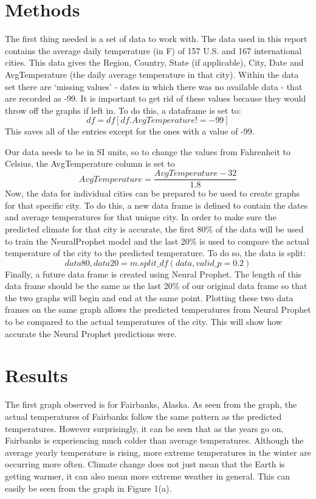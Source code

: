 \documentclass[11pt,a4paper,fleqn]{article}
\begin{document}
\section{Methods}\label{sec:Methods}
The first thing needed is a set of data to work with. The data used in this report contains the average daily temperature (in \textdegree F) of 157 U.S. and 167 international cities.\cite{daytonwebsite} This data gives the Region, Country, State (if applicable), City, Date and AvgTemperature (the daily average temperature in that city). Within the data set there are `missing values' - dates in which there was no available data - that are recorded as -99. It is important to get rid of these values because they would throw off the graphs if left in. To do this, a dataframe is set to: 
$$df = df[df.AvgTemperature != -99]$$
This saves all of the entries except for the ones with a value of -99. \par
Our data needs to be in SI units, so to change the values from Fahrenheit to Celsius, the AvgTemperature column is set to 
$$AvgTemperature = \frac{AvgTemperature - 32}{1.8}$$
Now, the data for individual cities can be prepared to be used to create graphs for that specific city. To do this, a new data frame is defined to contain the dates and average temperatures for that unique city. In order to make sure the predicted climate for that city is accurate, the first 80\% of the data will be used to train the NeuralProphet model and the last 20\% is used to compare the actual temperature of the city to the predicted temperature. To do so, the data is split:
$$data80, data20 = m.split\_df(data, valid\_p=0.2)$$
Finally, a future data frame is created using Neural Prophet. The length of this data frame should be the same as the last 20\% of our original data frame so that the two graphs will begin and end at the same point. Plotting these two data frames on the same graph allows the predicted temperatures from Neural Prophet to be compared to the actual temperatures of the city. This will show how accurate the Neural Prophet predictions were. 

\section{Results}\label{sec:Results}
The first graph observed is for Fairbanks, Alaska. As seen from the graph, the actual temperatures of Fairbanks follow the same pattern as the predicted temperatures. However surprisingly, it can be seen that as the years go on, Fairbanks is experiencing much colder than average temperatures. Although the average yearly temperature is rising, more extreme temperatures in the winter are occurring more often. Climate change does not just mean that the Earth is getting warmer, it can also mean more extreme weather in general.\cite{palmer2014record} This can easily be seen from the graph in Figure 1(a). 
\end{document}
